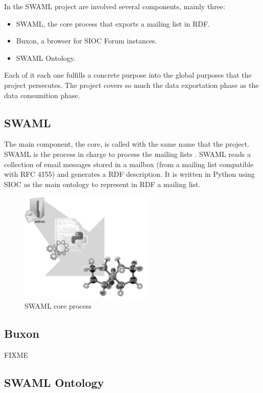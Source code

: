 \documentclass{llncs}
\begin{document}
In the SWAML project are involved several components, mainly three:

\begin{itemize}
 \item SWAML, the core process that exports a mailing list in RDF.
 \item Buxon, a browser for SIOC Forum instances.
 \item SWAML Ontology.
\end{itemize}

Each of it each one fulfills a concrete purpose into the global purposes that 
the project persecutes. The project covers so much the data exportation phase 
as the data consumition phase.

\subsection{SWAML}

The main component, the core, is called with the same name that the project. SWAML is
the process in charge to process the mailing lists . SWAML reads a collection of email 
messages stored in a mailbox (from a mailing list compatible with RFC 4155) and generates 
a RDF description. It is written in Python using SIOC as the main ontology to represent 
in RDF a mailing list.

\begin{figure}[ht]
 \centering
 \includegraphics[bb=0 0 238 200]{images/swaml-process.png}
 \caption{SWAML core process}
\end{figure}

\subsection{Buxon}

FIXME

\subsection{SWAML Ontology}
\end{document}
